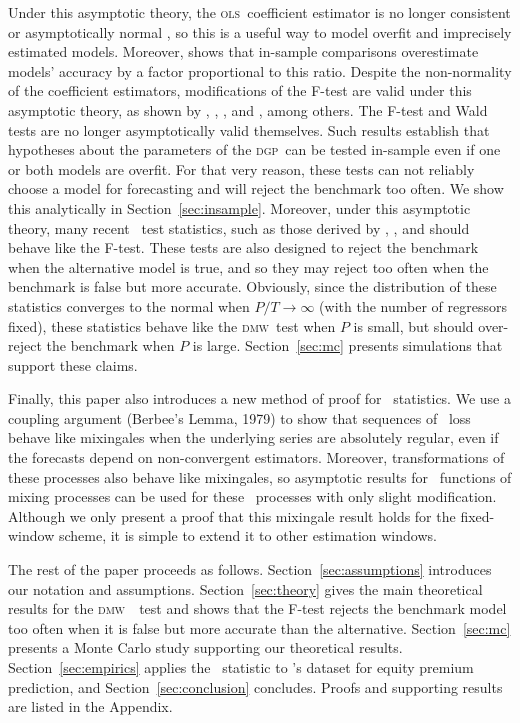 \documentclass[11pt]{article}
\newcommand{\citepos}[1]{\citeauthor{#1}'s \citeyearpar{#1}}
\newcommand{\dmw}{\textsc{dmw}}
\newcommand{\ols}{\textsc{ols}}
\newcommand{\dgp}{\textsc{dgp}}
\begin{document}
Under this asymptotic theory, the \ols\ coefficient estimator is no
longer consistent or asymptotically normal \citep{huber_robust_1973},
so this is a useful way to model overfit and imprecisely estimated
models.  Moreover, \citet{efron_biased_1986,efron_estimation_2004}
shows that in-sample comparisons overestimate models' accuracy by a
factor proportional to this ratio.  Despite the non-normality of the
coefficient estimators, modifications of the F-test are valid under
this asymptotic theory, as shown by \citet{boos_anova_1995},
\citet{akritas_asymptotics_2000},
\citet{akritas_heteroscedastic_2004}, and
\citet{calhoun_hypothesis_2009}, among others.  The F-test and Wald
tests are no longer asymptotically valid themselves.  Such results
establish that hypotheses about the parameters of the \dgp\ can be
tested in-sample even if one or both models are overfit.  For that
very reason, these tests can not reliably choose a model for
forecasting and will reject the benchmark too often.  We show this
analytically in Section~\ref{sec:insample}.  Moreover, under this
asymptotic theory, many recent \oos\ test statistics, such as those
derived by \cite{clark_tests_2001,clark_evaluating_2005},
\citet{mccracken_asymptotics_2007}, and
\citet{clark_using_2006,clark_approximately_2007} should behave like
the F-test.  These tests are also designed to reject the benchmark
when the alternative model is true, and so they may reject too often
when the benchmark is false but more accurate.  Obviously, since the
distribution of these statistics converges to the normal when $P/T \to
\infty$ (with the number of regressors fixed), these statistics behave
like the \dmw\ test when $P$ is small, but should over-reject the
benchmark when $P$ is large.  Section~\ref{sec:mc} presents
simulations that support these claims.

Finally, this paper also introduces a new method of proof for \oos\
statistics.  We use a coupling argument (Berbee's Lemma, 1979) to show
that sequences of \oos\ loss behave like mixingales when the
underlying series are absolutely regular, even if the forecasts depend
on non-convergent estimators.  Moreover, transformations of these
processes also behave like mixingales, so asymptotic results for \ned\
functions of mixing processes can be used for these \oos\ processes
with only slight modification.  Although we only present a proof that
this mixingale result holds for the fixed-window scheme, it is simple
to extend it to other estimation windows.

The rest of the paper proceeds as follows.
Section~\ref{sec:assumptions} introduces our notation and assumptions.
Section~\ref{sec:theory} gives the main theoretical results for the
\dmw\ \oos\ test and shows that the F-test rejects the benchmark model
too often when it is false but more accurate than the
alternative. Section~\ref{sec:mc} presents a Monte Carlo study
supporting our theoretical results.  Section~\ref{sec:empirics}
applies the \oos\ statistic to \citepos{goyal-welch-2008-rfs} dataset
for equity premium prediction, and Section~\ref{sec:conclusion}
concludes.  Proofs and supporting results are listed in the Appendix.
\end{document}
